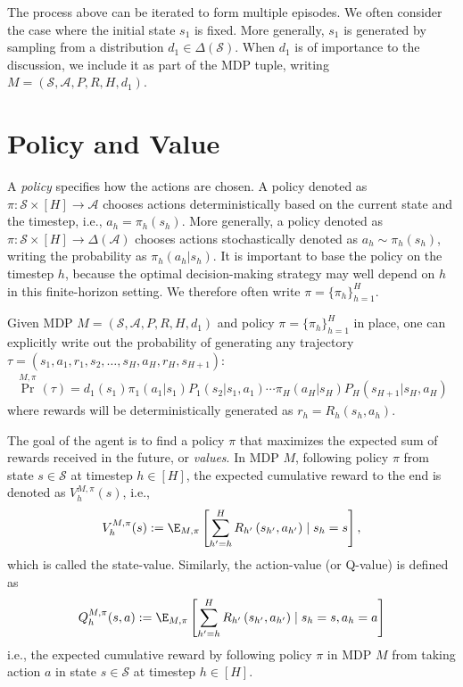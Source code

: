 The process above can be iterated to form multiple episodes. We often consider the case where the initial state $s_1$ is fixed. More generally, $s_1$ is generated by sampling from a distribution $d_1\in \Delta(\mathcal{S})$.
When $d_1$ is of importance to the discussion, we include it as part of the MDP tuple, writing $M=(\mathcal{S},\mathcal{A}, P, R, H, d_1)$.


\section{Policy and Value}
A {\em policy} specifies how the actions are chosen.
A policy denoted as $\pi:\mathcal{S}\times[H]\to\mathcal{A}$ chooses actions deterministically based on the current state and the timestep, i.e., $a_h=\pi_h(s_h)$.
More generally, a policy denoted as $\pi:\mathcal{S}\times[H]\to\Delta(\mathcal{A})$ chooses actions stochastically denoted as $a_h\sim\pi_h(s_h)$, writing the probability as $\pi_h(a_h|s_h)$.
It is important to base the policy on the timestep $h$, because the optimal decision-making strategy may well depend on $h$ in this finite-horizon setting.
We therefore often write $\pi=\{\pi_h\}_{h=1}^H$.

Given MDP $M=(\mathcal{S},\mathcal{A}, P, R, H, d_1)$ and policy $\pi=\{\pi_h\}_{h=1}^H$ in place, one can explicitly write out the probability of generating any trajectory $\tau=\left(s_1, a_1, r_1, s_2, \ldots, s_H, a_H, r_H, s_{H+1}\right)$:
\begin{align*}
    \textstyle\Pr^{M,\pi}(\tau) = d_1(s_1)\pi_1(a_1|s_1)P_1(s_2|s_1,a_1)\cdots\pi_H(a_H|s_H)P_H(s_{H+1}|s_H,a_H)
\end{align*}
where rewards will be deterministically generated as $r_h=R_h(s_h,a_h)$.

The goal of the agent is to find a policy $\pi$ that maximizes the expected sum of rewards received in the future, or {\em values}.
In MDP $M$, following policy $\pi$ from state $s\in\mathcal{S}$ at timestep $h\in[H]$, the expected cumulative reward to the end is denoted as $V^{M,\pi}_h(s)$, i.e.,
\begin{align*}  V^{M,\pi}_h(s):=\E_{M,\pi}\left[\sum_{h^{\prime}=h}^H R_{h^{\prime}}\left(s_{h^{\prime}}, a_{h^{\prime}}\right) \mid s_h=s\right]
,
\end{align*}
which is called the state-value.
Similarly, the action-value (or Q-value) is defined as 
\begin{align*}
    Q^{M,\pi}_h(s, a):=\E_{M,\pi}\left[\sum_{h^{\prime}=h}^H R_{h^{\prime}}\left(s_{h^{\prime}}, a_{h^{\prime}}\right) \mid s_h=s, a_h=a\right]
\end{align*}
i.e., the expected cumulative reward by following policy $\pi$ in MDP $M$ from taking action $a$ in state $s\in\mathcal{S}$ at timestep $h\in[H]$.

